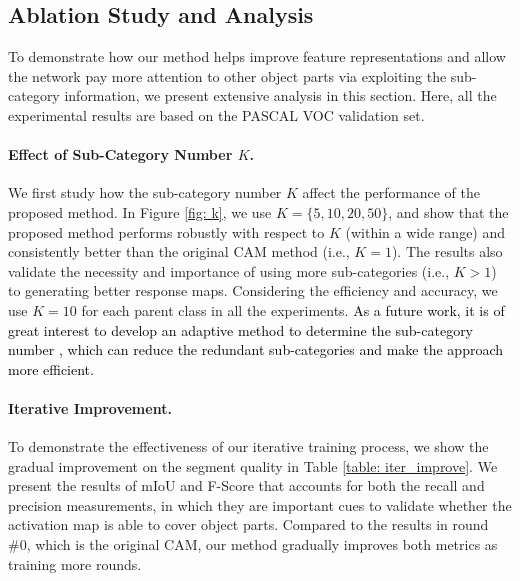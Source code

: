 \documentclass[10pt,twocolumn,letterpaper]{article}
\begin{document}
\subsection{Ablation Study and Analysis}
To demonstrate how our method helps improve feature representations and allow the network pay more attention to other object parts via exploiting the sub-category information, we present extensive analysis in this section.
Here, all the experimental results are based on the PASCAL VOC validation set.

\vspace{-2mm}
\paragraph{Effect of Sub-Category Number $K$.}
We first study how the sub-category number $K$  affect the performance of the proposed method. 
In Figure \ref{fig: k}, we use $K = \{5, 10, 20, 50\}$, and show that the proposed method performs robustly with respect to $K$ (within a wide range) and consistently better than the original CAM method (i.e., $K = 1$).
The results also validate the necessity and importance of using more sub-categories (i.e., $K>1$) to generating better response maps. 
Considering the efficiency and accuracy, we use $K = 10$ for each parent class in all the experiments.
\textcolor{black}{As a future work, it is of great interest to develop an adaptive method to determine the sub-category number \cite{sarfraz2019efficient}, which can reduce the redundant sub-categories and make the approach more efficient.}





\vspace{-2mm}
\paragraph{Iterative Improvement.}
To demonstrate the effectiveness of our iterative training process, we show the gradual improvement on the segment quality in Table \ref{table: iter_improve}.
We present the results of mIoU and F-Score that accounts for both the recall and precision measurements, in which they are important cues to validate whether the activation map is able to cover object parts.
Compared to the results in round \#0, which is the original CAM, our method gradually improves both metrics as training more rounds.
\end{document}
